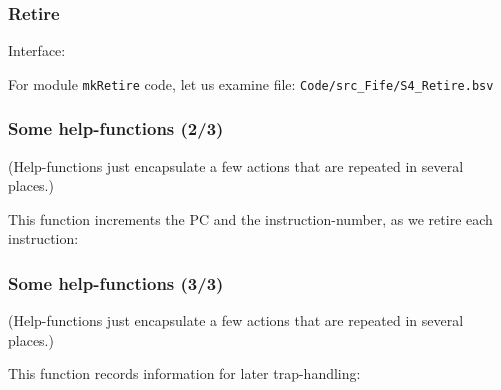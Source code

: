 
\begin{frame}[fragile]
\frametitle{Retire}

\footnotesize

Interface: \hmmmm
\begin{minipage}{0.725\textwidth}
\end{minipage}

\vspace{1ex}

For module {\tt mkRetire} code, let us examine file: {\tt Code/src\_Fife/S4\_Retire.bsv}

\end{frame}


\begin{frame}[fragile]
\frametitle{Some help-functions (2/3)}

\footnotesize

(Help-functions just encapsulate a few actions that are repeated in several places.)

\vspace{5ex}

This function increments the PC and the instruction-number, as we retire each instruction:

\vspace{4ex}

\begin{minipage}{0.725\textwidth}
\end{minipage}

\end{frame}


\begin{frame}[fragile]
\frametitle{Some help-functions (3/3)}

\footnotesize

(Help-functions just encapsulate a few actions that are repeated in several places.)

\vspace{5ex}

This function records information for later trap-handling:

\vspace{4ex}

\begin{minipage}{0.725\textwidth}
\end{minipage}

\end{frame}

